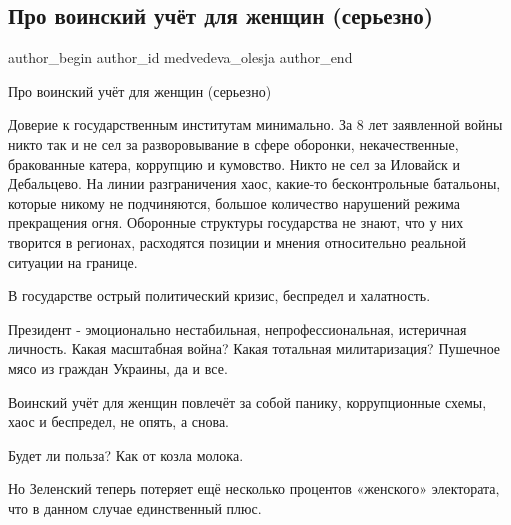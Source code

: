  
 
 
 
 
 
\subsection{Про воинский учёт для женщин (серьезно)}
\label{sec:23_12_2021.fb.medvedeva_olesja.1.voinskij_uchet_dlja_zhenschin}
 
\ifcmt
 author_begin
   author_id medvedeva_olesja
 author_end
\fi

Про воинский учёт для женщин (серьезно)

Доверие к государственным институтам минимально. За 8 лет заявленной войны
никто так и не сел за разворовывание в сфере оборонки, некачественные,
бракованные катера, коррупцию и кумовство. Никто не сел за Иловайск и
Дебальцево. На линии разграничения хаос, какие-то бесконтрольные батальоны,
которые никому не подчиняются, большое количество нарушений режима прекращения
огня. Оборонные структуры государства не знают, что у них творится в регионах,
расходятся позиции и мнения относительно реальной ситуации на границе.

В государстве острый политический кризис, беспредел и халатность. 

Президент - эмоционально нестабильная, непрофессиональная, истеричная личность.
Какая масштабная война? Какая тотальная милитаризация? Пушечное мясо из граждан
Украины, да и все. 

Воинский учёт для женщин повлечёт за собой панику, коррупционные схемы, хаос и
беспредел, не опять, а снова. 

Будет ли польза? Как от козла молока.

Но Зеленский теперь потеряет ещё несколько процентов «женского» электората, что
в данном случае единственный плюс.

